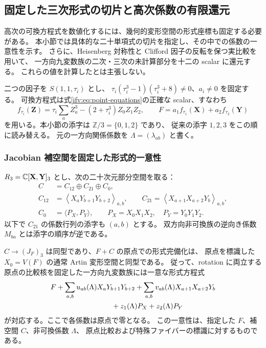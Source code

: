 \subsection{固定した三次形式の切片と高次係数の有限還元}
\label{ifj:subsec:jets}

高次の可換方程式を数値化するには、幾何的変形空間の形式座標も固定する必要がある。
本小節では具体的な二十単項式の切片を指定し、その中での係数の一意性を示す。
さらに、Heisenberg 対称性と Clifford 因子の反転を保つ実比較を用いて、
一方向九変数族の二次・三次の未計算部分を十二の scalar に還元する。
これらの値を計算したとは主張しない。

二つの因子を $S(1,1,\tau_i)$ とし、
$\tau_i(\tau_i^3-1)(\tau_i^3+8)\ne0$、$a_i\ne0$ を固定する。
可換方程式は式\eqref{ifv:eq:point-equations}の正確な scalar、すなわち
\[
 f_{\tau_i}(\mathbf Z)=\tau_i\sum_a Z_a^3-(2+\tau_i^3)Z_0Z_1Z_2,
 \qquad F=a_1f_{\tau_1}(\mathbf X)+a_2f_{\tau_2}(\mathbf Y)
\]
を用いる。本小節の添字は $\mathbb Z/3=\{0,1,2\}$ であり、
従来の添字 $1,2,3$ をこの順に読み替える。
元の一方向関係係数を $\Lambda=(\lambda_{ab})$ と書く。

\subsubsection{Jacobian 補空間を固定した形式的一意性}

$R_3=\mathbb C[\mathbf X,\mathbf Y]_3$ とし、次の二十次元部分空間を取る：
\begin{equation}\label{ifj:eq:slice}
 \begin{split}
 C&=C_{12}\oplus C_{21}\oplus C_0,\\
 C_{12}&=\left\langle X_aY_{b+1}Y_{b+2}\right\rangle_{a,b},\qquad
 C_{21}=\left\langle X_{a+1}X_{a+2}Y_b\right\rangle_{a,b},\\
 C_0&=\langle P_X,P_Y\rangle,\qquad
 P_X=X_0X_1X_2,\quad P_Y=Y_0Y_1Y_2.
 \end{split}
\end{equation}
以下で $C_{21}$ の係数行列の添字も $(a,b)$ とする。
双方向非可換族の逆向き係数 $M_{ba}$ とは添字の順序が逆である。

\begin{lemma}[具体的な線型切片による標識付き変形の座標]
\label{ifj:lem:linear-slice}
$C\to(J_F)_3$ は同型であり、$F+C$ の原点での形式完備化は、
原点を標識した $X_0=V(F)$ の通常 Artin 変形空間と同型である。
従って、rotation に両立する原点の比較核を固定した一方向九変数族には一意な形式方程式
\begin{equation}\label{ifj:eq:normalized-family}
 \begin{split}
 &F+\sum_{a,b}u_{ab}(\Lambda)X_aY_{b+1}Y_{b+2}
   +\sum_{a,b}v_{ab}(\Lambda)X_{a+1}X_{a+2}Y_b\\
 &\hspace{30mm}+z_1(\Lambda)P_X+z_2(\Lambda)P_Y
 \end{split}
\end{equation}
が対応する。ここで各係数は原点で零となる。
この一意性は、指定した $F$、補空間 $C$、非可換係数 $\Lambda$、
原点比較および特殊ファイバーの標識に対するものである。
\end{lemma}

